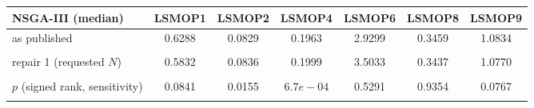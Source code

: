 \footnotesize
\setlength{\tabcolsep}{4pt}
\begin{tabular}{lcccccc}
\toprule
NSGA-III (median) & LSMOP1 & LSMOP2 & LSMOP4 & LSMOP6 & LSMOP8 & LSMOP9 \\
\midrule
as published & 0.6288 & 0.0829 & 0.1963 & 2.9299 & 0.3459 & 1.0834 \\\\
repair 1 (requested $N$) & 0.5832 & 0.0836 & 0.1999 & 3.5033 & 0.3437 & 1.0770 \\\\
\addlinespace
$p$ (signed rank, sensitivity) & 0.0841 & 0.0155 & $6.7e-04$ & 0.5291 & 0.9354 & 0.0767 \\\\
\bottomrule
\end{tabular}
